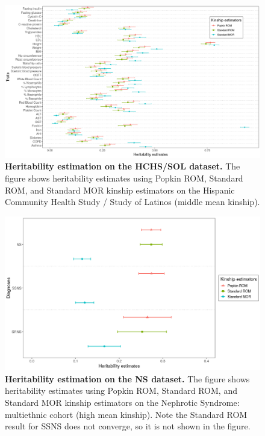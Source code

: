 \documentclass[11pt]{article}
\begin{document}
\begin{figure}[bp!]
  \centering
  \includegraphics[width=\textwidth]{data/Fig2_HCHS_All_maf001_agesex.png}
  \caption{
    {\bf Heritability estimation on the HCHS/SOL dataset.}
    The figure shows heritability estimates using Popkin ROM, Standard ROM, and Standard MOR kinship estimators on the Hispanic Community Health Study / Study of Latinos (middle mean kinship).
    }
  \label{fig:HCHS}
\end{figure}

\begin{figure}[bp!]
  \centering
  \includegraphics[width=\textwidth]{data/Fig2_NS_sex_array.png}
  \caption{
    {\bf Heritability estimation on the NS dataset.}
    The figure shows heritability estimates using Popkin ROM, Standard ROM, and Standard MOR kinship estimators on the Nephrotic Syndrome: multiethnic cohort (high mean kinship). Note the Standard ROM result for SSNS does not converge, so it is not shown in the figure.
    }
  \label{fig:NS}
\end{figure}
\end{document}
